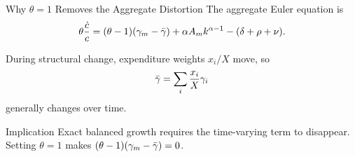 \begin{frame}[label=appendixbalanced]{Why $\theta=1$ Removes the Aggregate Distortion}
  \small
  The aggregate Euler equation is
  \[
    \theta\frac{\dot c}{c}
    =
    (\theta-1)(\gamma_m-\bar{\gamma})
    +\alpha A_m k^{\alpha-1}-(\delta+\rho+\nu).
  \]

  During structural change, expenditure weights $x_i/X$ move, so
  \[
    \bar{\gamma}=\sum_i\frac{x_i}{X}\gamma_i
  \]
  generally changes over time.

  \vspace{0.12cm}
  \begin{alertblock}{Implication}
    Exact balanced growth requires the time-varying term to disappear. Setting
    $\theta=1$ makes $(\theta-1)(\gamma_m-\bar{\gamma})=0$.
  \end{alertblock}

  \hyperlink{balancedgrowth}{}
\end{frame}
